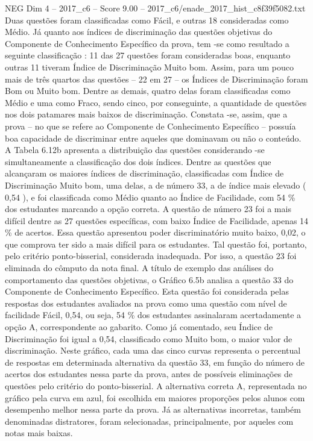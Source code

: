 \begin{textsample}{NEG Dim 4 – 2017\_c6 – Score 9.00 – 2017\_c6/enade\_2017\_hist\_c8f39f5082.txt}
Duas questões foram classificadas como Fácil, e outras 18 consideradas como Médio.
Já quanto aos índices de discriminação das questões objetivas do Componente de Conhecimento Específico da prova, tem -se como resultado a seguinte classificação : 11 das 27 questões foram consideradas boas, enquanto outras 11 tiveram Índice de Discriminação Muito bom.
Assim, para um pouco mais de três quartos das questões – 22 em 27 – os Índices de Discriminação foram Bom ou Muito bom.
Dentre as demais, quatro delas foram classificadas como Médio e uma como Fraco, sendo cinco, por conseguinte, a quantidade de questões nos dois patamares mais baixos de discriminação.
Constata -se, assim, que a prova – no que se refere ao Componente de Conhecimento Específico – possuía boa capacidade de discriminar entre aqueles que dominavam ou não o conteúdo.
A Tabela 6.12b apresenta a distribuição das questões considerando -se simultaneamente a classificação dos dois índices.
Dentre as questões que alcançaram os maiores índices de discriminação, classificadas com Índice de Discriminação Muito bom, uma delas, a de número 33, a de índice mais elevado ( 0,54 ), e foi classificada como Médio quanto ao Índice de Facilidade, com 54 \% dos estudantes marcando a opção correta.
A questão de número 23 foi a mais difícil dentre as 27 questões específicas, com baixo Índice de Facilidade, apenas 14 \% de acertos.
Essa questão apresentou poder discriminatório muito baixo, 0,02, o que comprova ter sido a mais difícil para os estudantes.
Tal questão foi, portanto, pelo critério ponto-bisserial, considerada inadequada.
Por isso, a questão 23 foi eliminada do cômputo da nota final.
A título de exemplo das análises do comportamento das questões objetivas, o Gráfico 6.5b analisa a questão 33 do Componente de Conhecimento Específico.
Esta questão foi considerada pelas respostas dos estudantes avaliados na prova como uma questão com nível de facilidade Fácil, 0,54, ou seja, 54 \% dos estudantes assinalaram acertadamente a opção A, correspondente ao gabarito.
Como já comentado, seu Índice de Discriminação foi igual a 0,54, classificado como Muito bom, o maior valor de discriminação.
Neste gráfico, cada uma das cinco curvas representa o percentual de respostas em determinada alternativa da questão 33, em função do número de acertos dos estudantes nessa parte da prova, antes de possíveis eliminações de questões pelo critério do ponto-bisserial.
A alternativa correta A, representada no gráfico pela curva em azul, foi escolhida em maiores proporções pelos alunos com desempenho melhor nessa parte da prova.
Já as alternativas incorretas, também denominadas distratores, foram selecionadas, principalmente, por aqueles com notas mais baixas.

\end{textsample}
